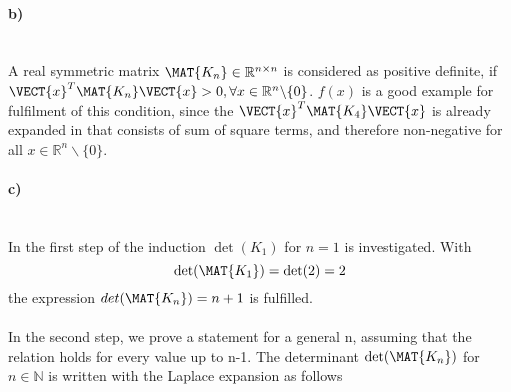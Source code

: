 \paragraph{b)}\mbox{} \\
A real symmetric matrix $\MAT{K_n} \in \mathbb{R}^{n \times n}$ is considered as positive definite, if $\VECT{x}^T \MAT{K_n} \VECT{x} > 0, \forall x \in \mathbb{R}^n \backslash \{0\}$. $f(x)$ is a good example for fulfilment of this condition, since the $\VECT{x}^T \MAT{K_4} \VECT{x}$ is already expanded in  that consists of sum of square terms, and therefore non-negative for all $x \in \mathbb{R}^n \backslash \{0\}$.

\paragraph{c)}\mbox{} \\
In the first step of the induction $\det(K_1)$ for $n = 1$ is investigated. With
\begin{equation}
	\det(\MAT{K_1}) = \det(2) = 2
\end{equation}
the expression $det(\MAT{K_n}) = n + 1 $ is fulfilled.
\\
\\
In the second step, we prove a statement for a general n, assuming that the relation holds for every value up to n-1. The determinant $\det (\MAT{K_n})$ for $n \in \mathbb{N}$ is written with the Laplace expansion as follows
